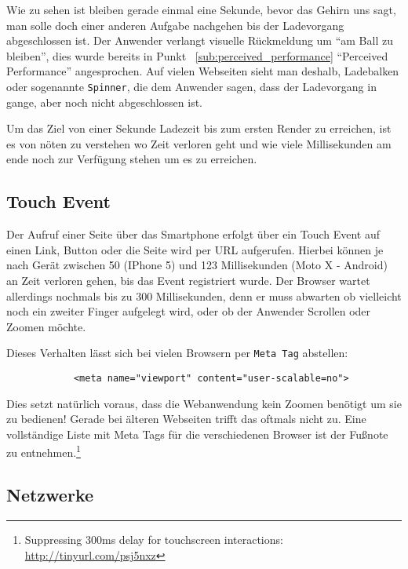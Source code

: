 	Wie zu sehen ist bleiben gerade einmal eine Sekunde, bevor das Gehirn uns sagt, man solle doch einer anderen Aufgabe nachgehen bis der Ladevorgang abgeschlossen ist. Der Anwender verlangt visuelle Rückmeldung um "`am Ball zu bleiben"', dies wurde bereits in Punkt ~\ref{sub:perceived_performance} "`Perceived Performance"' angesprochen. Auf vielen Webseiten sieht man deshalb, Ladebalken oder sogenannte \texttt{Spinner}, die dem Anwender sagen, dass der Ladevorgang in gange, aber noch nicht abgeschlossen ist.

	Um das Ziel von einer Sekunde Ladezeit bis zum ersten Render zu erreichen, ist es von nöten zu verstehen wo Zeit verloren geht und wie viele Millisekunden am ende noch zur Verfügung stehen um es zu erreichen.\\

	\subsection{Touch Event} %
	\label{sub:touch_event}
		Der Aufruf einer Seite über das Smartphone erfolgt über ein Touch Event auf einen Link, Button oder die Seite wird per URL aufgerufen. Hierbei können je nach Gerät zwischen 50 (IPhone 5) und 123 Millisekunden (Moto X - Android) an Zeit verloren gehen, bis das Event registriert wurde.\autocite{venturebeat} Der Browser wartet allerdings nochmals bis zu 300 Millisekunden, denn er muss abwarten ob vielleicht noch ein zweiter Finger aufgelegt wird, oder ob der Anwender Scrollen oder Zoomen möchte.\autocite{google11}

		Dieses Verhalten lässt sich bei vielen Browsern per \texttt{Meta Tag} abstellen:

		\begin{lstlisting}
			<meta name="viewport" content="user-scalable=no">
		\end{lstlisting}

		Dies setzt natürlich voraus, dass die Webanwendung kein Zoomen benötigt um sie zu bedienen! Gerade bei älteren Webseiten trifft das oftmals nicht zu. Eine vollständige Liste mit Meta Tags für die verschiedenen Browser ist der Fußnote zu entnehmen.\footnote{Suppressing 300ms delay for touchscreen interactions: \url{http://tinyurl.com/psj5nxz}}


	\subsection{Netzwerke} %
	\label{sub:netzwerke}


